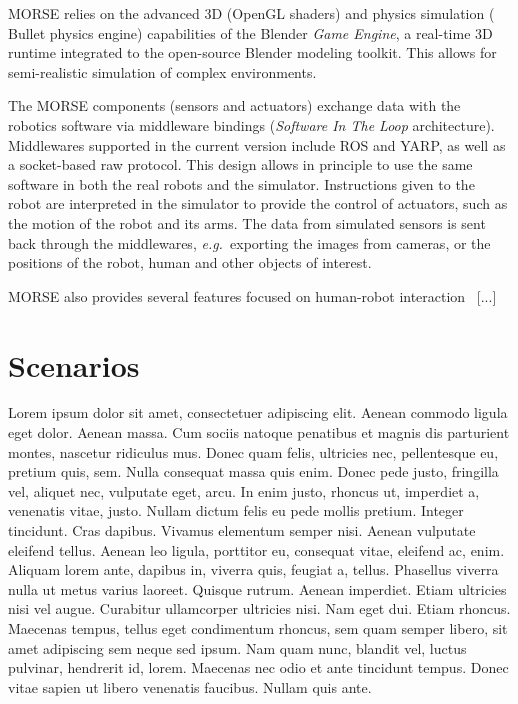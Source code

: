 \documentclass[conference]{IEEEtran}
\newcommand{\eg}{{\textit{e.g.~}}}
\begin{document}
MORSE relies on the advanced 3D (OpenGL shaders) and physics simulation ({\sc
Bullet} physics engine) capabilities of the Blender \emph{Game Engine}, a
real-time 3D runtime integrated to the open-source Blender modeling toolkit.
This allows for semi-realistic simulation of complex environments.

The MORSE components (sensors and actuators) exchange data with the robotics
software via middleware bindings (\emph{Software In The Loop} architecture).
Middlewares supported in the current version include ROS and YARP, as well as a
socket-based raw protocol. This design allows in principle to use the same
software in both the real robots and the simulator. Instructions given to the
robot are interpreted in the simulator to provide the control of actuators, such
as the motion of the robot and its arms.  The data from simulated sensors is
sent back through the middlewares, \eg exporting the images from cameras, or the
positions of the robot, human and other objects of interest.

MORSE also provides several features focused on human-robot
interaction~\cite{lemaignan2012morse} [...]

\section{Scenarios}

Lorem ipsum dolor sit amet, consectetuer adipiscing elit. Aenean commodo ligula
eget dolor. Aenean massa. Cum sociis natoque penatibus et magnis dis parturient
montes, nascetur ridiculus mus. Donec quam felis, ultricies nec, pellentesque
eu, pretium quis, sem. Nulla consequat massa quis enim. Donec pede justo,
fringilla vel, aliquet nec, vulputate eget, arcu. In enim justo, rhoncus ut,
imperdiet a, venenatis vitae, justo. Nullam dictum felis eu pede mollis pretium.
Integer tincidunt. Cras dapibus. Vivamus elementum semper nisi. Aenean vulputate
eleifend tellus. Aenean leo ligula, porttitor eu, consequat vitae, eleifend ac,
enim. Aliquam lorem ante, dapibus in, viverra quis, feugiat a, tellus. Phasellus
viverra nulla ut metus varius laoreet. Quisque rutrum. Aenean imperdiet. Etiam
ultricies nisi vel augue. Curabitur ullamcorper ultricies nisi. Nam eget dui.
Etiam rhoncus. Maecenas tempus, tellus eget condimentum rhoncus, sem quam semper
libero, sit amet adipiscing sem neque sed ipsum. Nam quam nunc, blandit vel,
luctus pulvinar, hendrerit id, lorem. Maecenas nec odio et ante tincidunt
tempus. Donec vitae sapien ut libero venenatis faucibus. Nullam quis ante. 
\end{document}
